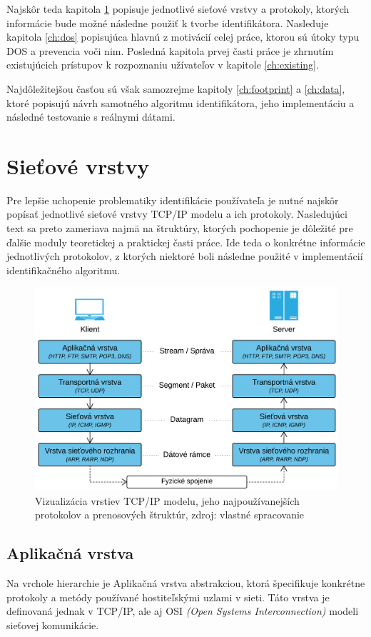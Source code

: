 \documentclass[
  digital, %
  table,   %
  lof,     %
  nolot,   %
  nocover
]{fithesis3}
\begin{document}
Najskôr teda kapitola
\ref{ch:net-layers} popisuje jednotlivé sieťové vrstvy a protokoly, ktorých
informácie bude možné následne použiť k tvorbe identifikátora. 
Nasleduje kapitola \ref{ch:dos} popisujúca hlavnú z motivácií 
celej práce, ktorou sú útoky typu DOS a prevencia voči nim.
Posledná kapitola prvej časti práce je zhrnutím
existujúcich prístupov k rozpoznaniu užívateľov v kapitole \ref{ch:existing}.

Najdôležitejšou časťou sú však
samozrejme kapitoly \ref{ch:footprint} a \ref{ch:data}, ktoré popisujú návrh samotného 
algoritmu identifikátora, jeho implementáciu a následné testovanie s reálnymi dátami.

\chapter{Sieťové vrstvy}
\label{ch:net-layers}
Pre lepšie uchopenie problematiky identifikácie používateľa je nutné najskôr
popísať jednotlivé sieťové vrstvy TCP/IP modelu a
ich protokoly. Nasledujúci text sa preto zameriava najmä na štruktúry, ktorých pochopenie je
dôležité pre ďalšie moduly teoretickej a praktickej časti práce. Ide teda o
konkrétne informácie jednotlivých protokolov, z ktorých niektoré boli následne použité v implementácií
identifikačného algoritmu.

\begin{figure}[h]
  \centering
    \includegraphics[width=.99\textwidth]{images/net-layers.png}
  \caption{Vizualizácia vrstiev TCP/IP modelu, jeho najpoužívanejších protokolov
  a prenosových štruktúr, zdroj: vlastné spracovanie}
  \label{fig:net-layers}
\end{figure}

\section{Aplikačná vrstva}
Na vrchole hierarchie je Aplikačná vrstva abstrakciou, ktorá špecifikuje
konkrétne protokoly a metódy používané hostiteľskými uzlami v sieti. Táto
vrstva je definovaná jednak v TCP/IP, ale aj OSI
\textit{(Open Systems Interconnection)} modeli sieťovej komunikácie.
\end{document}
